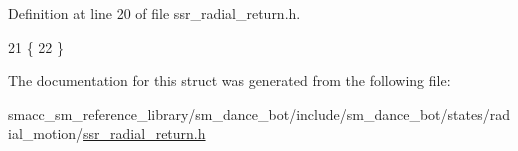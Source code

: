 Definition at line 20 of file ssr\+\_\+radial\+\_\+return.\+h.


\begin{DoxyCode}
21   \{
22   \}
\end{DoxyCode}


The documentation for this struct was generated from the following file\+:\begin{DoxyCompactItemize}
\item 
smacc\+\_\+sm\+\_\+reference\+\_\+library/sm\+\_\+dance\+\_\+bot/include/sm\+\_\+dance\+\_\+bot/states/radial\+\_\+motion/\hyperlink{ssr__radial__return_8h}{ssr\+\_\+radial\+\_\+return.\+h}\end{DoxyCompactItemize}
